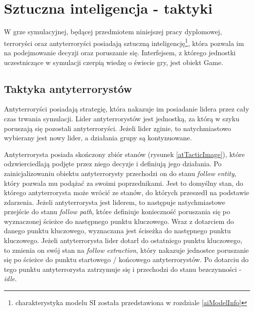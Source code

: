 \chapter{Sztuczna inteligencja - taktyki}\label{tacticts}
W grze symulacyjnej, będącej przedmiotem niniejszej pracy dyplomowej, terroryści oraz antyterroryści posiadają sztuczną inteligencję\footnote{charakterystyka modelu SI została przedstawiona w rozdziale \ref{aiModelInfo}}, która pozwala im na podejmowanie decyzji oraz poruszanie się. Interfejsem, z którego jednostki uczestniczące w symulacji czerpią wiedzę o świecie gry, jest obiekt Game. 

\section{Taktyka antyterrorystów}
Antyterroryści posiadają strategię, która nakazuje im posiadanie lidera przez cały czas trwania symulacji. Lider antyterrorystów jest jednostką, za którą w szyku poruszają się pozostali antyterroryści. Jeżeli lider zginie, to natychmiastowo wybierany jest nowy lider, a działania grupy są kontynuowane.

Antyterrorysta posiada skończony zbiór stanów (rysunek \ref{atTacticImage}), które odzwierciedlają podjęte przez niego decyzje i definiują jego działania. Po zainicjalizowaniu obiektu antyterrorysty przechodzi on do stanu \emph{follow entity}, który pozwala mu podążać za swoimi poprzednikami. Jest to domyślny stan, do którego antyterrorysta może wrócić ze stanów, do których przeszedł na podstawie zdarzenia. Jeżeli antyterrorysta jest liderem, to następuje natychmiastowe przejście do stanu \emph{follow path}, które definiuje konieczność poruszania się po wyznaczonej ścieżce do następnego punktu kluczowego. Wraz z dotarciem do danego punktu kluczowego, wyznaczana jest ściseżka do następnego punktu kluczowego. Jeżeli antyterrorysta lider dotarł do ostatniego punktu kluczowego, to zmienia on swój stan na \emph{follow extraction}, który nakazuje jednostce poruszanie się po ścieżce do punktu startowego / końcowego antyterrorystów. Po dotarciu do tego punktu antyterrorysta zatrzymuje się i przechodzi do stanu bezczynności - \emph{idle}.

